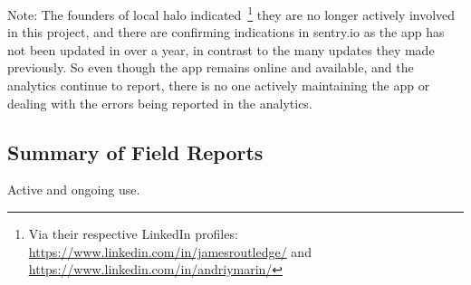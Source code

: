 Note: The founders of local halo indicated~\footnote{Via their respective LinkedIn profiles: \url{https://www.linkedin.com/in/jamesroutledge/} and \url{https://www.linkedin.com/in/andriymarin/}} they are no longer actively involved in this project, and there are confirming indications in sentry.io as the app has not been updated in over a year, in contrast to the many updates they made previously. So even though the app remains online and available, and the analytics continue to report, there is no one actively maintaining the app or dealing with the errors being reported in the analytics.

\subsection{Summary of Field Reports}
Active and ongoing use. 

